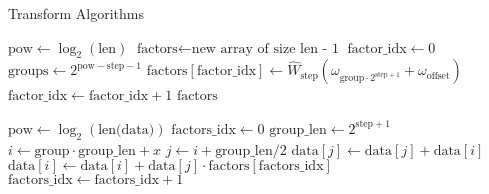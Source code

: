 \begin{algorithm}
    \caption{Transform Algorithms}
    \begin{algorithmic}
            \State $\text{pow} \gets \log_2(\text{len})$
            \State $\text{factors} \gets \text{new array of size } \text{len - 1}$
            \State $\text{factor\_idx} \gets 0$
                \State $\text{groups} \gets 2^{\text{pow} - \text{step} - 1}$
                    \State $\text{factors}[\text{factor\_idx}] \gets \hat{W}_{\text{step}}(\omega_{\text{group} \cdot 2^{\text{step} + 1}} + \omega_{\text{offset}})$
                    \State $\text{factor\_idx} \gets \text{factor\_idx} + 1$
                \EndFor
            \EndFor
            \State \Return $\text{factors}$
        \EndFunction
    \end{algorithmic}

    \begin{algorithmic}
            \State $\text{pow} \gets \log_2(\text{len(data)})$
            \State $\text{factors\_idx} \gets 0$
                \State $\text{group\_len} \gets 2^{\text{step} + 1}$
                        \State $i \gets \text{group} \cdot \text{group\_len} + x$
                        \State $j \gets i + \text{group\_len} / 2$
                        \State $\text{data}[j] \gets \text{data}[j] + \text{data}[i]$
                        \State $\text{data}[i] \gets \text{data}[i] + \text{data}[j] \cdot \text{factors}[\text{factors\_idx}]$
                    \EndFor
                \EndFor
                \State $\text{factors\_idx} \gets \text{factors\_idx} + 1$
            \EndFor
        \EndFunction
    \end{algorithmic}


\end{algorithm}
